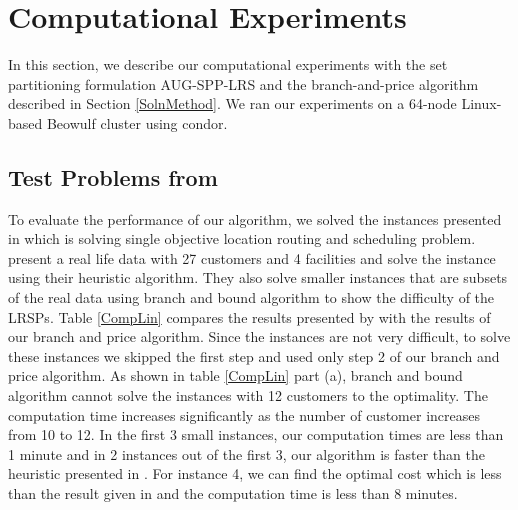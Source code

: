 















\chapter{Computational Experiments} 
\label{computationalexp}
In this section, we describe our computational experiments with
the set partitioning formulation AUG-SPP-LRS and the branch-and-price 
algorithm described in Section \ref{SolnMethod}. We ran our experiments on a 
64-node Linux-based Beowulf cluster using condor. 


\section{Test Problems from \citet{Lin}}
To evaluate the performance of our algorithm, we solved the instances
presented in \citet{Lin}  which is solving single 
objective location routing and scheduling problem. 
\citet{Lin} present a real life data with 27 customers and 4 facilities 
and solve the instance using their heuristic algorithm. They also solve smaller 
instances that are subsets of the real data using branch and bound algorithm to show 
the difficulty of the LRSPs. Table \ref{CompLin} compares the results presented by \citet{Lin}
with the results of our branch and price algorithm. Since the instances
are not very difficult, to solve these instances we skipped the first step
and used only step 2 of our branch and price algorithm.  
As shown in table \ref{CompLin} part (a), branch and bound algorithm cannot solve the 
instances with 12 customers to the optimality. The computation time increases significantly
as the number of customer increases from 10 to 12. In the first 3 small instances,
our computation times are less than 1 minute and in 2 instances out of the first 3, 
our algorithm is faster than the heuristic presented in \citet{Lin}. For instance 4,
we can find the optimal cost which is less than the result given in  \citet{Lin} and 
the computation time is less than 8 minutes.   
